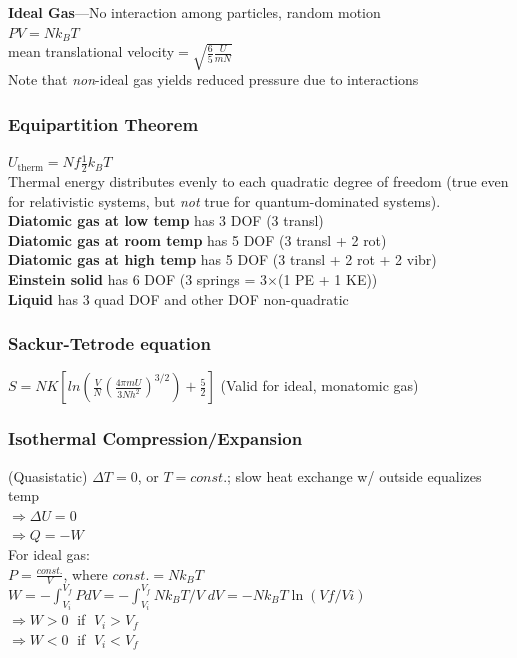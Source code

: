 \documentclass[letterpaper,landscape,10pt]{article}
\begin{document}
{\begin{multicols}{4}
  \textbf{Ideal Gas}---No interaction among particles, random motion \\
    \hspace{5pt}$PV=Nk_{B}T$ \\
	\hspace{5pt}mean translational velocity$= \sqrt{\frac{6}{5}\frac{U}{mN}}$ \\
  	\hspace{5pt}Note that \emph{non}-ideal gas yields reduced pressure due to interactions\\
  \subsubsection*{Equipartition Theorem}
    $U_{\textrm{therm}}=Nf\frac{1}{2}k_BT$ \\
    Thermal energy distributes evenly to each quadratic degree of freedom
    (true even for relativistic systems, but \emph{not} true for
    quantum-dominated systems). \\
    \textbf{Diatomic gas at low temp} has 3 DOF (3 transl) \\
    \textbf{Diatomic gas at room temp} has 5 DOF (3 transl + 2 rot) \\
    \textbf{Diatomic gas at high temp} has 5 DOF (3 transl + 2 rot + 2 vibr) \\
    \textbf{Einstein solid} has 6 DOF (3 springs = 3$\times$(1 PE + 1 KE)) \\
    \textbf{Liquid} has 3 quad DOF and other DOF non-quadratic \\
  \subsubsection*{Sackur-Tetrode equation}
    $S=NK\left[ ln\left( \frac{V}{N}\left( \frac{4\pi mU}{3Nh^2} \right)^{3/2} \right)+\frac{5}{2} \right]$ (Valid for ideal, monatomic gas)
  \subsubsection*{Isothermal Compression/Expansion} (Quasistatic)
    $\Delta T = 0$, or $T = const.$; slow heat exchange w/ outside equalizes temp\\
	$\Rightarrow \Delta U = 0$\\
	$\Rightarrow Q = -W$\\
	For ideal gas:\\
	\hspace{5pt}$P = \frac{const.}{V}$, where $const. = Nk_BT$\\
	\hspace{5pt}$W = -\int_{V_i}^{V_f}PdV = -\int_{V_i}^{V_f}Nk_BT/V\;dV = -Nk_BT \ln (Vf/Vi)$\\
	\hspace{5pt}$\Rightarrow W>0\;$ if $\;V_i > V_f$\\
	\hspace{5pt}$\Rightarrow W<0\;$ if $\;V_i < V_f$\\

\end{multicols}}
\end{document}
